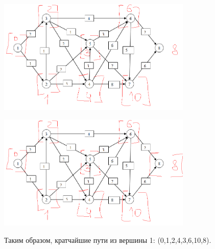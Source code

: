 \documentclass[12pt]{article}
\begin{document}
\begin{center}
\includegraphics[width=350]{14_7.png}
\end{center}
\begin{center}
\includegraphics[width=350]{14_8.png}
\end{center}

Таким образом, кратчайшие пути из вершины 1: (0,1,2,4,3,6,10,8).
\end{document}
